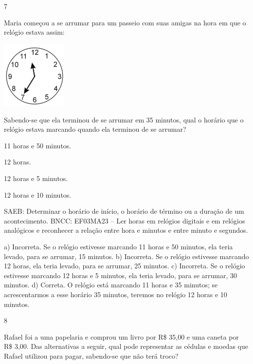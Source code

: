 {\begin{escolha}
{\num{7}

Maria começou a se arrumar para um passeio com suas amigas na hora em que o relógio estava assim:


\includegraphics[width=1.29487in,height=1.32633in]{media/image134.png}

Sabendo-se que ela terminou de se arrumar em 35 minutos, qual o horário que o relógio estava marcando quando ela terminou de se arrumar?

\begin{escolha}

\item
  11 horas e 50 minutos.
\item
  12 horas.
\item
  12 horas e 5 minutos.
\item
  12 horas e 10 minutos.
\end{escolha}

SAEB: Determinar o horário de início, o horário de término ou a duração de um acontecimento.
BNCC: EF03MA23 – Ler horas em relógios digitais e em relógios analógicos e reconhecer a relação
entre hora e minutos e entre minuto e segundos.

a) Incorreta. Se o relógio estivesse marcando 11 horas e 50 minutos, ela teria levado, para se arrumar, 15 minutos.
b) Incorreta. Se o relógio estivesse marcando 12 horas, ela teria levado, para se arrumar, 25 minutos.
c) Incorreta. Se o relógio estivesse marcando 12 horas e 5 minutos, ela teria levado, para se arrumar, 30 minutos.
d) Correta. O relógio está marcando 11 horas e 35 minutos; se acrescentarmos a esse horário 35 minutos, teremos no relógio 12 horas e 10 minutos.

\num{8}

Rafael foi a uma papelaria e comprou um livro por R\$ 35,00 e uma caneta
por R\$ 3,00. Das alternativas a seguir, qual pode representar as cédulas
e moedas que Rafael utilizou para pagar, sabendo-se que não terá troco?

\begin{escolha}


\end{escolha}}
\end{escolha}}
